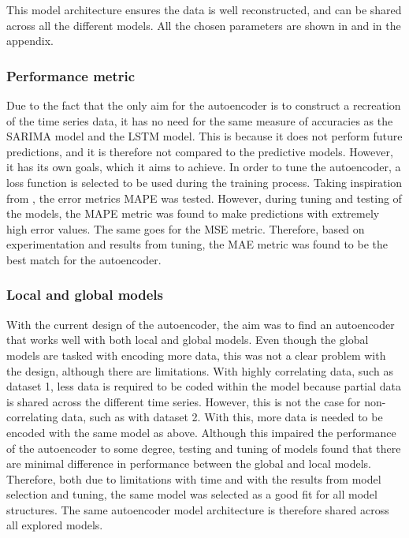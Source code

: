 This model architecture ensures the data is well reconstructed,
and can be shared across all the different models.
All the chosen parameters are shown in 
and  in the appendix.




\subsubsection{Performance metric}
Due to the fact that the only aim for the autoencoder is to construct a recreation of the time series data,
it has no need for the same measure of accuracies as the SARIMA model and the LSTM model.
This is because it does not perform future predictions, and it is therefore not compared to the predictive models.
However, it has its own goals, which it aims to achieve.
In order to tune the autoencoder, a loss function is selected to be used during the training process.
Taking inspiration from \cite{Zhao2019}, the error metrics MAPE was tested.
However, during tuning and testing of the models, the MAPE metric was found to make predictions with extremely high error values.
The same goes for the MSE metric.
Therefore, based on experimentation and results from tuning,
the MAE metric was found to be the best match for the autoencoder.


\subsubsection{Local and global models}
With the current design of the autoencoder, the aim was to find an autoencoder that works well with both local and global models.
Even though the global models are tasked with encoding more data, this was not a clear problem with the design, although there are limitations.
With highly correlating data, such as dataset 1, less data is required to be coded within the model because partial data is shared across the different time series.
However, this is not the case for non-correlating data, such as with dataset 2.
With this, more data is needed to be encoded with the same model as above.
Although this impaired the performance of the autoencoder to some degree, testing and tuning of models found that there are minimal difference in performance between the global and local models.
Therefore, both due to limitations with time and with the results from model selection and tuning,
the same model was selected as a good fit for all model structures.
The same autoencoder model architecture is therefore shared across all explored models.

